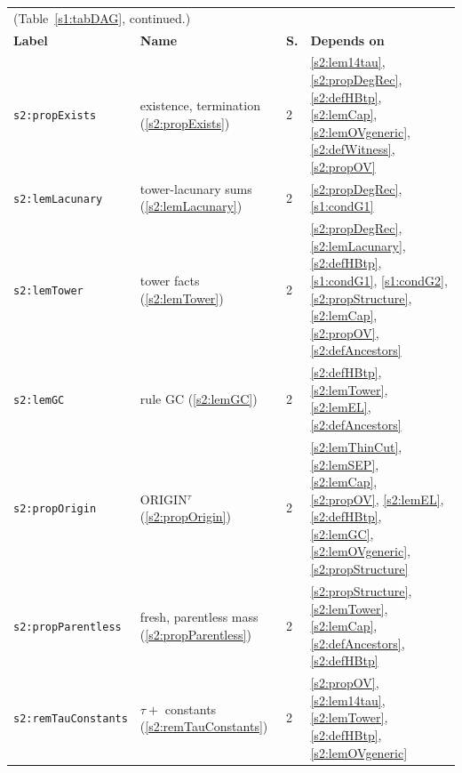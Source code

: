 \begin{center}
{\footnotesize
\setlength{\tabcolsep}{3pt}
\begin{tabular}{p{3.2cm}p{3.6cm}p{0.5cm}p{7.6cm}}
\multicolumn{4}{l}{(Table~\ref{s1:tabDAG}, continued.)}\\
\textbf{Label} & \textbf{Name} & \textbf{S.} & \textbf{Depends on}\\
\hline
\texttt{s2:propExists} & existence, termination (\ref{s2:propExists}) & 2 & \ref{s2:lem14tau}, \ref{s2:propDegRec}, \ref{s2:defHBtp}, \ref{s2:lemCap}, \ref{s2:lemOVgeneric}, \ref{s2:defWitness}, \ref{s2:propOV}\\
\texttt{s2:lemLacunary} & tower-lacunary sums (\ref{s2:lemLacunary}) & 2 & \ref{s2:propDegRec}, \ref{s1:condG1}\\
\texttt{s2:lemTower} & tower facts (\ref{s2:lemTower}) & 2 & \ref{s2:propDegRec}, \ref{s2:lemLacunary}, \ref{s2:defHBtp}, \ref{s1:condG1}, \ref{s1:condG2}, \ref{s2:propStructure}, \ref{s2:lemCap}, \ref{s2:propOV}, \ref{s2:defAncestors}\\
\texttt{s2:lemGC} & rule GC (\ref{s2:lemGC}) & 2 & \ref{s2:defHBtp}, \ref{s2:lemTower}, \ref{s2:lemEL}, \ref{s2:defAncestors}\\
\texttt{s2:propOrigin} & ORIGIN$^\tau$ (\ref{s2:propOrigin}) & 2 & \ref{s2:lemThinCut}, \ref{s2:lemSEP}, \ref{s2:lemCap}, \ref{s2:propOV}, \ref{s2:lemEL}, \ref{s2:defHBtp}, \ref{s2:lemGC}, \ref{s2:lemOVgeneric}, \ref{s2:propStructure}\\
\texttt{s2:propParentless} & fresh, parentless mass (\ref{s2:propParentless}) & 2 & \ref{s2:propStructure}, \ref{s2:lemTower}, \ref{s2:lemCap}, \ref{s2:defAncestors}, \ref{s2:defHBtp}\\
\texttt{s2:remTauConstants} & $\tau{+}$ constants (\ref{s2:remTauConstants}) & 2 & \ref{s2:propOV}, \ref{s2:lem14tau}, \ref{s2:lemTower}, \ref{s2:defHBtp}, \ref{s2:lemOVgeneric}\\
\hline
\end{tabular}}
\end{center}

